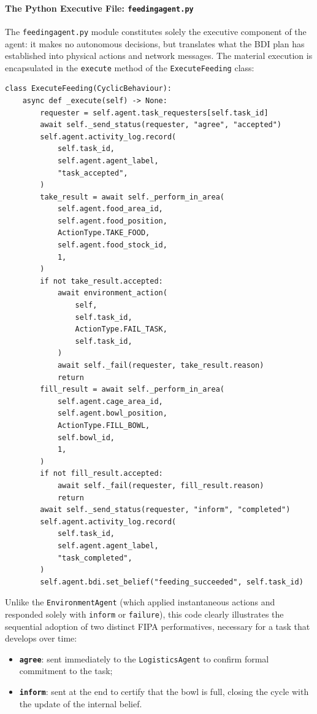 \documentclass{article}
\renewcommand{\_}{\oldtextunderscore\allowbreak}
\begin{document}
\paragraph{The Python Executive File: \texttt{feeding\_agent.py}}
The \texttt{feeding\_agent.py} module constitutes solely the executive component of the agent: it makes no autonomous decisions, but translates what the BDI plan has established into physical actions and network messages.
The material execution is encapsulated in the \texttt{\_execute} method of the \texttt{ExecuteFeeding} class:
\begin{lstlisting}
class ExecuteFeeding(CyclicBehaviour):
    async def _execute(self) -> None:
        requester = self.agent.task_requesters[self.task_id]
        await self._send_status(requester, "agree", "accepted")
        self.agent.activity_log.record(
            self.task_id,
            self.agent.agent_label,
            "task_accepted",
        )
        take_result = await self._perform_in_area(
            self.agent.food_area_id,
            self.agent.food_position,
            ActionType.TAKE_FOOD,
            self.agent.food_stock_id,
            1,
        )
        if not take_result.accepted:
            await environment_action(
                self,
                self.task_id,
                ActionType.FAIL_TASK,
                self.task_id,
            )
            await self._fail(requester, take_result.reason)
            return
        fill_result = await self._perform_in_area(
            self.agent.cage_area_id,
            self.agent.bowl_position,
            ActionType.FILL_BOWL,
            self.bowl_id,
            1,
        )
        if not fill_result.accepted:
            await self._fail(requester, fill_result.reason)
            return
        await self._send_status(requester, "inform", "completed")
        self.agent.activity_log.record(
            self.task_id,
            self.agent.agent_label,
            "task_completed",
        )
        self.agent.bdi.set_belief("feeding_succeeded", self.task_id)
\end{lstlisting}
Unlike the \texttt{EnvironmentAgent} (which applied instantaneous actions and responded solely with \texttt{inform} or \texttt{failure}), this code clearly illustrates the sequential adoption of two distinct FIPA performatives, necessary for a task that develops over time:
\begin{itemize}
    \item \textbf{\texttt{agree}}: sent immediately to the \texttt{LogisticsAgent} to confirm formal commitment to the task;
    \item \textbf{\texttt{inform}}: sent at the end to certify that the bowl is full, closing the cycle with the update of the internal belief.
\end{itemize}
\end{document}
